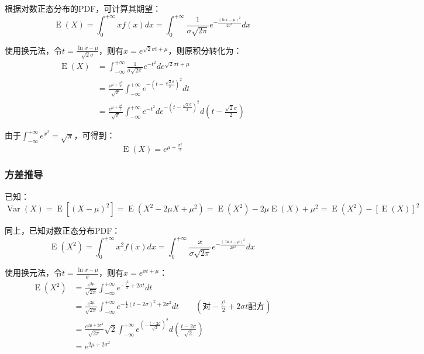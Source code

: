 \documentclass[11pt]{article}
\newcommand{\E}{\operatorname{E}}
\newcommand{\Var}{\operatorname{Var}}
\begin{document}
根据对数正态分布的PDF，可计算其期望：
\begin{equation*}
    \E(X) = \int^{+\infty}_0 x f(x) dx = \int^{+\infty}_0 \frac{1}{\sigma\sqrt{2\pi}} e^{-\frac{(ln x - \mu)^2}{2\sigma^2}} dx
\end{equation*}

使用换元法，令$t = \frac{\ln x - \mu}{\sqrt{2}\sigma}$，则有$x = e^{\sqrt{2}\sigma t + \mu}$，则原积分转化为：
\begin{align*}
    \E(X) &= \int^{+\infty}_{-\infty} \frac{1}{\sigma\sqrt{2\pi}}e^{-t^2}d e^{\sqrt{2}\sigma t + \mu}\\ 
    &= \frac{e^{\mu + \frac{\sigma^2}{2}}}{\sqrt{\pi}} \int^{+\infty}_{-\infty} e^{-(t-\frac{\sqrt{2}\sigma}{2})^2} dt\\ 
    &= \frac{e^{\mu + \frac{\sigma^2}{2}}}{\sqrt{\pi}} \int^{+\infty}_{-\infty} e^{-t^2}d e^{-(t-\frac{\sqrt{2}\sigma}{2})^2} d(t-\frac{\sqrt{2}\sigma}{2})
\end{align*}

由于$\int^{+\infty}_{-\infty} e^{x^2} = \sqrt{\pi}$，可得到：
\begin{equation*}
    \E(X) = e^{\mu+\frac{\sigma^2}{2}}
\end{equation*}

\subsubsection{方差推导}

已知：
\begin{equation*}
    \Var(X) = \E[(X-\mu)^2] = \E(X^2 -2\mu X + \mu^2) = \E(X^2) -2\mu \E(X) + \mu^{2} = \E(X^2) - [\E(X)]^2
\end{equation*}

同上，已知对数正态分布PDF：
\begin{equation*}
    \E(X^2) = \int^{+\infty}_0 x^2 f(x) dx = \int^{+\infty}_0 \frac{x}{\sigma\sqrt{2\pi}} e^{-\frac{(\ln x - \mu)^2}{2\sigma^2}} dx
\end{equation*}

使用换元法，令$t = \frac{\ln x-\mu}{\sigma}$，则有$x = e^{\sigma t + \mu}$：
\begin{align*}
    \E(X^2) &= \frac{e^{2\mu}}{\sqrt{2\pi}} \int^{+\infty }_{-\infty } e^{-\frac{t^2}{2}+2\sigma t}dt \\
    &= \frac{e^{2\mu}}{\sqrt{2\pi}} \int^{+\infty }_{-\infty } e^{-\frac{1}{2}(t-2\sigma)^2 + 2\sigma^2}dt \qquad 
    \left(\text{对}-\frac{t^2}{2}+2 \sigma t \text{配方}\right) \\
    &= \frac{e^{2\mu+2\sigma^2}}{\sqrt{2\pi}} \sqrt{2} \int^{+\infty}_{-\infty} e^{(-\frac{t-2\sigma}{\sqrt{2}})^2} d\left(\frac{t-2\sigma}{\sqrt{2}}\right)\\
    &= e^{2\mu +2\sigma^2}
\end{align*}
\end{document}
